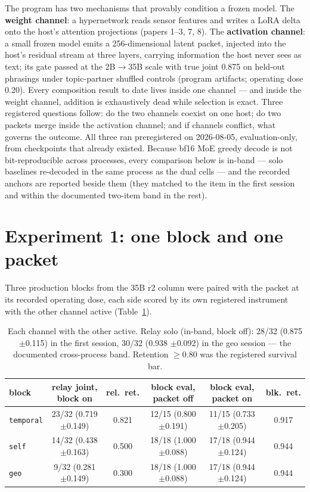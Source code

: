 \documentclass[11pt]{article}
\begin{document}
The program has two mechanisms that provably condition a frozen model. The
\textbf{weight channel}: a hypernetwork reads sensor features and writes a
LoRA delta onto the host's attention projections (papers 1--3, 7, 8). The
\textbf{activation channel}: a small frozen model emits a 256-dimensional
latent packet, injected into the host's residual stream at three layers,
carrying information the host never sees as text; its gate passed at the
2B$\to$35B scale with true joint 0.875 on held-out
phrasings under topic-partner shuffled controls (program artifacts;
operating dose 0.20). Every composition result to date lives inside one
channel --- and inside the weight channel, addition is exhaustively dead
while selection is exact. Three registered questions follow: do the two
channels coexist on one host; do two packets merge inside the activation
channel; and if channels conflict, what governs the outcome. All three ran
preregistered on 2026-08-05, evaluation-only, from checkpoints that already
existed. Because bf16 MoE greedy decode is not bit-reproducible across
processes, every comparison below is in-band --- solo baselines re-decoded
in the same process as the dual cells --- and the recorded anchors are
reported beside them (they matched to the item in the first session and
within the documented two-item band in the rest).

\section{Experiment 1: one block and one packet}

Three production blocks from the 35B r2 column were paired with the packet
at its recorded operating dose, each side scored by its own registered
instrument with the other channel active (Table~\ref{tab:dual}).

\begin{table}[h]
\centering
\small
\begin{tabular}{lccccc}
\toprule
block & relay joint, block on & rel.\ ret. & block eval, packet off & block eval, packet on & blk.\ ret. \\
\midrule
\texttt{temporal} & 23/32 (0.719 $\pm$0.149) & 0.821 & 12/15 (0.800 $\pm$0.191) & 11/15 (0.733 $\pm$0.205) & 0.917 \\
\texttt{self} & 14/32 (0.438 $\pm$0.163) & 0.500 & 18/18 (1.000 $\pm$0.088) & 17/18 (0.944 $\pm$0.124) & 0.944 \\
\texttt{geo} & 9/32 (0.281 $\pm$0.149) & 0.300 & 18/18 (1.000 $\pm$0.088) & 17/18 (0.944 $\pm$0.124) & 0.944 \\
\bottomrule
\end{tabular}
\caption{Each channel with the other active. Relay solo (in-band, block
off): 28/32 (0.875 $\pm$0.115) in the first session,
30/32 (0.938 $\pm$0.092) in the geo session --- the
documented cross-process band. Retention $\geq 0.80$ was the registered
survival bar.}
\label{tab:dual}
\end{table}
\end{document}

